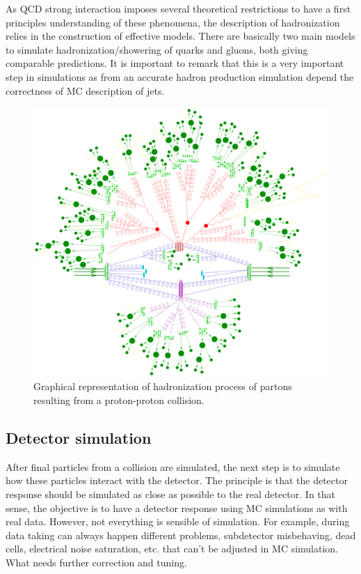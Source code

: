 As QCD strong interaction imposes several theoretical restrictions to have a first principles understanding of these phenomena, the description of hadronization relies in the construction of effective models. There are basically two main models to simulate hadronization/showering of quarks and gluons, both giving comparable predictions. It is important to remark that this is a very important step in simulations as from an accurate hadron production simulation depend the correctness of MC description of jets.

\begin{figure}[!Hhtbp]
  \begin{center}
    \includegraphics[width=\textwidth]{figs/parton_shower.png}
    \caption{Graphical representation of hadronization process of partons resulting from a proton-proton collision.}
    \label{fig:Hadr}
  \end{center}
\end{figure}

\subsection{Detector simulation}
\label{sec:detector}

After final particles from a collision are simulated, the next step is to simulate how these particles interact with the detector. The principle is that the detector response should be simulated as close as possible to the real detector. In that sense, the objective is to have a detector response using MC simulations as with real data. However, not everything is sensible of simulation. For example, during data taking can always happen different problems, subdetector misbehaving, dead cells, electrical noise saturation, etc. that can't be adjusted in MC simulation. What needs further correction and tuning. 

